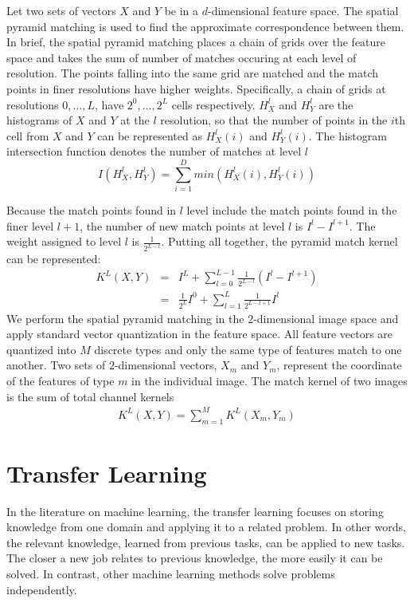 Let two sets of vectors $X$ and $Y$ be in a $d$-dimensional feature space. The spatial pyramid matching is used to find the approximate correspondence between them. In brief, the spatial pyramid matching places a chain of grids over the feature space and takes the sum of number of matches occuring at each level of resolution. The points falling into the same grid are matched and the match points in finer resolutions have higher weights. Specifically, a chain of grids at resolutions $0,\dotso,L$, have $2^0,\dotso,2^L$ cells respectively. $H_{X}^l$ and $H_{Y}^l$ are the histograms of $X$ and $Y$ at the $l$ resolution, so that the number of points in the $i$th cell from $X$ and $Y$ can be represented as $H_{X}^l(i)$ and $H_{Y}^l(i)$. The histogram intersection function denotes the number of matches at level $l$
\begin{equation}\label{eq:HistInterFunc}
I(H_{X}^l, H_{Y}^l) = \sum_{i=1}^D min(H_{X}^l(i), H_{Y}^l(i))
\end{equation}

Because the match points found in $l$ level include the match points found in the finer level $l+1$, the number of new match points at level $l$ is $I^l - I^{l+1}$. The weight assigned to level $l$ is $\frac{1}{2^{L-l}}$. Putting all together, the pyramid match kernel can be represented:
\begin{eqnarray}\label{eq:PyramidChanMatchKernel}
  K^L(X,Y) & = & I^L + \sum_{l=0}^{L-1} \frac{1}{2^{L-l}}(I^l-I^{l+1})\\
 & = & \frac{1}{2^L}I^0 + \sum_{l=1}^{L}\frac{1}{2^{L-l+1}}I^l
\end{eqnarray}
We perform the spatial pyramid matching in the $2$-dimensional image space and apply standard vector quantization in the feature space. All feature vectors are quantized into $M$ discrete types and only the same type of features match to one another. Two sets of $2$-dimensional vectors, $X_m$ and $Y_m$, represent the coordinate of the features of type $m$ in the individual image. The match kernel of two images is the sum of total channel kernels
\begin{eqnarray}\label{eq:PyramidMatchKernel}
  K^L(X,Y) = \sum_{m=1}^{M} K^L(X_m, Y_m)
\end{eqnarray}

\section{Transfer Learning}

In the literature on machine learning, the transfer learning\citep{pan2010survey} focuses on storing knowledge from one domain and applying it to a related problem. In other words, the relevant knowledge, learned from previous tasks, can be applied to new tasks. The closer a new job relates to previous knowledge, the more easily it can be solved. In contrast, other machine learning methods solve problems independently. 


